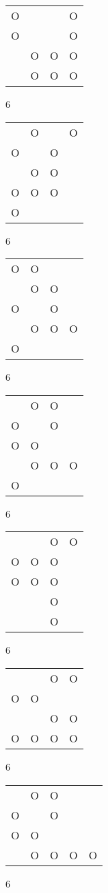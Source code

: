 \begin{tabular}{|m{0.2cm}m{0.2cm}m{0.2cm}m{0.2cm}|}\hline
O& & &O\\
O& & &O\\
 &O&O&O\\
 &O&O&O\\
\hline\end{tabular}6
\begin{tabular}{|m{0.2cm}m{0.2cm}m{0.2cm}m{0.2cm}|}\hline
 &O& &O\\
O& &O& \\
 &O&O& \\
O&O&O& \\
O& & & \\
\hline\end{tabular}6
\begin{tabular}{|m{0.2cm}m{0.2cm}m{0.2cm}m{0.2cm}|}\hline
O&O& & \\
 &O&O& \\
O& &O& \\
 &O&O&O\\
O& & & \\
\hline\end{tabular}6
\begin{tabular}{|m{0.2cm}m{0.2cm}m{0.2cm}m{0.2cm}|}\hline
 &O&O& \\
O& &O& \\
O&O& & \\
 &O&O&O\\
O& & & \\
\hline\end{tabular}6
\begin{tabular}{|m{0.2cm}m{0.2cm}m{0.2cm}m{0.2cm}|}\hline
 & &O&O\\
O&O&O& \\
O&O&O& \\
 & &O& \\
 & &O& \\
\hline\end{tabular}6
\begin{tabular}{|m{0.2cm}m{0.2cm}m{0.2cm}m{0.2cm}|}\hline
 & &O&O\\
O&O& & \\
 & &O&O\\
O&O&O&O\\
\hline\end{tabular}6
\begin{tabular}{|m{0.2cm}m{0.2cm}m{0.2cm}m{0.2cm}m{0.2cm}|}\hline
 &O&O& & \\
O& &O& & \\
O&O& & & \\
 &O&O&O&O\\
\hline\end{tabular}6
